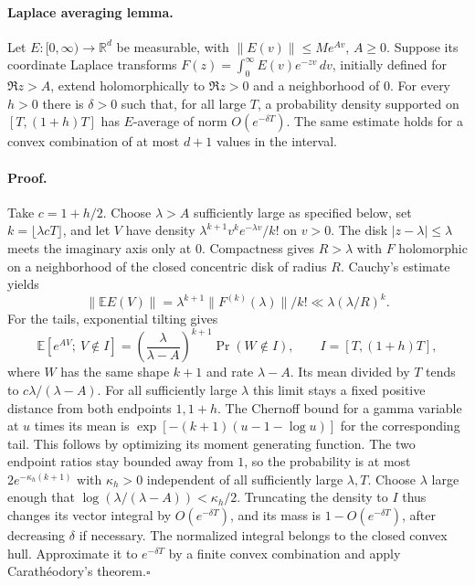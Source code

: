 \paragraph{Laplace averaging lemma.}
Let $E:[0,\infty)\to\mathbb R^d$ be measurable, with
$\|E(v)\|\leq M e^{Av}$, $A\geq0$. Suppose its coordinate Laplace
transforms $F(z)=\int_0^\infty E(v)e^{-zv}\,dv$, initially defined
for $\Re z>A$, extend holomorphically to $\Re z>0$ and a neighborhood of
$0$. For every $h>0$ there is $\delta>0$ such that, for all large $T$,
a probability density supported on $[T,(1+h)T]$ has $E$-average of
norm $O(e^{-\delta T})$. The same estimate holds for a convex
combination of at most $d+1$ values in the interval.

\paragraph{Proof.}
Take $c=1+h/2$. Choose $\lambda>A$ sufficiently large as specified
below, set $k=\lfloor\lambda cT\rfloor$, and let $V$ have density
$\lambda^{k+1}v^ke^{-\lambda v}/k!$ on $v>0$. The disk
$|z-\lambda|\leq\lambda$ meets the imaginary axis only at $0$.
Compactness gives $R>\lambda$ with $F$ holomorphic on a neighborhood
of the closed concentric disk of radius $R$. Cauchy's estimate yields
\[
 \|\mathbb E E(V)\|
 =\lambda^{k+1}\|F^{(k)}(\lambda)\|/k!
 \ll\lambda(\lambda/R)^k.
\]
For the tails, exponential tilting gives
\[
 \mathbb E[e^{AV};\ V\notin I]
 =\left(\frac{\lambda}{\lambda-A}\right)^{k+1}
      \Pr(W\notin I),\qquad I=[T,(1+h)T],
\]
where $W$ has the same shape $k+1$ and rate $\lambda-A$. Its mean
divided by $T$ tends to $c\lambda/(\lambda-A)$.
For all sufficiently large $\lambda$ this limit stays a fixed
positive distance from both endpoints $1,1+h$. The Chernoff bound for
a gamma variable at $u$ times its mean is
$\exp[-(k+1)(u-1-\log u)]$ for the corresponding tail. This follows
by optimizing its moment generating function.
The two endpoint ratios stay bounded away from $1$, so the probability
is at most $2e^{-\kappa_h(k+1)}$ with $\kappa_h>0$ independent of all
sufficiently large $\lambda,T$. Choose $\lambda$ large enough that
$\log(\lambda/(\lambda-A))<\kappa_h/2$. Truncating the density to $I$
thus changes its vector integral by $O(e^{-\delta T})$, and its mass
is $1-O(e^{-\delta T})$, after decreasing $\delta$ if necessary.
The normalized integral belongs to the closed convex hull. Approximate
it to $e^{-\delta T}$ by a finite convex combination and apply
Carath\'eodory's theorem.\hfill$\square$

